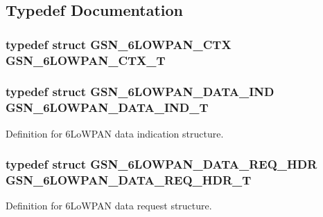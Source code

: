 \subsection{Typedef Documentation}
\hypertarget{a00472_a98fd6582f60bc04e61617c15aec72483}{
\subsubsection[{GSN\_\-6LOWPAN\_\-CTX\_\-T}]{\setlength{\rightskip}{0pt plus 5cm}typedef struct {\bf GSN\_\-6LOWPAN\_\-CTX} {\bf GSN\_\-6LOWPAN\_\-CTX\_\-T}}}
\label{a00472_a98fd6582f60bc04e61617c15aec72483}
\hypertarget{a00472_a0bdc410ca569b13e8f9cd9c65421d1fb}{
\subsubsection[{GSN\_\-6LOWPAN\_\-DATA\_\-IND\_\-T}]{\setlength{\rightskip}{0pt plus 5cm}typedef struct {\bf GSN\_\-6LOWPAN\_\-DATA\_\-IND} {\bf GSN\_\-6LOWPAN\_\-DATA\_\-IND\_\-T}}}
\label{a00472_a0bdc410ca569b13e8f9cd9c65421d1fb}


Definition for 6LoWPAN data indication structure. 

\hypertarget{a00472_a4442a22bbd09901ab9c7832e7c2b1afa}{
\subsubsection[{GSN\_\-6LOWPAN\_\-DATA\_\-REQ\_\-HDR\_\-T}]{\setlength{\rightskip}{0pt plus 5cm}typedef struct {\bf GSN\_\-6LOWPAN\_\-DATA\_\-REQ\_\-HDR} {\bf GSN\_\-6LOWPAN\_\-DATA\_\-REQ\_\-HDR\_\-T}}}
\label{a00472_a4442a22bbd09901ab9c7832e7c2b1afa}


Definition for 6LoWPAN data request structure. 



